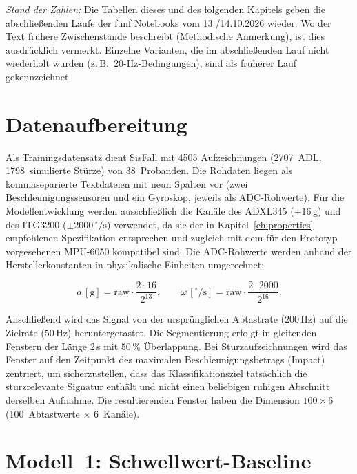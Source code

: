 \documentclass[11pt,a4paper,oneside]{report}
\begin{document}
\medskip
\noindent\textit{Stand der Zahlen:} Die Tabellen dieses und des
folgenden Kapitels geben die abschließenden Läufe der fünf Notebooks vom
13./14.10.2026 wieder. Wo der Text frühere Zwischenstände beschreibt
(\glqq Methodische Anmerkung\grqq), ist dies ausdrücklich vermerkt.
Einzelne Varianten, die im abschließenden Lauf nicht wiederholt wurden
(z.\,B.\ $20$-Hz-Bedingungen), sind als früherer Lauf gekennzeichnet.

\section{Datenaufbereitung}
\label{sec:preprocessing}

Als Trainingsdatensatz dient SisFall \cite{sucerquia2017sisfall} mit
4505 Aufzeichnungen (2707~ADL, 1798~simulierte Stürze) von
38~Probanden. Die Rohdaten liegen als kommaseparierte Textdateien mit
neun Spalten vor (zwei Beschleunigungssensoren und ein Gyroskop, jeweils
als ADC-Rohwerte). Für die Modellentwicklung werden ausschließlich die
Kanäle des ADXL345 ($\pm 16$\,g) und des ITG3200
($\pm 2000\,^{\circ}/\mathrm{s}$) verwendet, da sie der in
Kapitel~\ref{ch:properties} empfohlenen Spezifikation entsprechen und
zugleich mit dem für den Prototyp vorgesehenen MPU-6050 kompatibel sind.
Die ADC-Rohwerte werden anhand der Herstellerkonstanten in
physikalische Einheiten umgerechnet:

\begin{equation}
a\,[\mathrm{g}] = \mathrm{raw} \cdot \frac{2 \cdot 16}{2^{13}},
\qquad
\omega\,[^{\circ}/\mathrm{s}] = \mathrm{raw} \cdot \frac{2 \cdot 2000}{2^{16}}.
\label{eq:conversion}
\end{equation}

Anschließend wird das Signal von der ursprünglichen Abtastrate
($200$\,Hz) auf die Zielrate ($50$\,Hz) heruntergetastet. Die
Segmentierung erfolgt in gleitenden Fenstern der Länge $2$\,s mit
$50\,\%$ Überlappung. Bei Sturzaufzeichnungen wird das Fenster auf den
Zeitpunkt des maximalen Beschleunigungsbetrags (Impact) zentriert, um
sicherzustellen, dass das Klassifikationsziel tatsächlich die
sturzrelevante Signatur enthält und nicht einen beliebigen ruhigen
Abschnitt derselben Aufnahme. Die resultierenden Fenster haben die
Dimension $100 \times 6$ (100~Abtastwerte $\times$ 6~Kanäle).

\section{Modell~1: Schwellwert-Baseline}
\label{sec:threshold}
\end{document}
